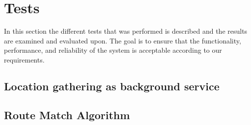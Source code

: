 \section{Tests}\label{sub:s3test}
In this section the different tests that was performed is described and the results are examined and evaluated upon.
The goal is to ensure that the functionality, performance, and reliability of the system is acceptable according to our requirements.

\subsection{Location gathering as background service}\label{subsec:bgstest2}



\subsection{Route Match Algorithm}\label{subsec:algotest}

